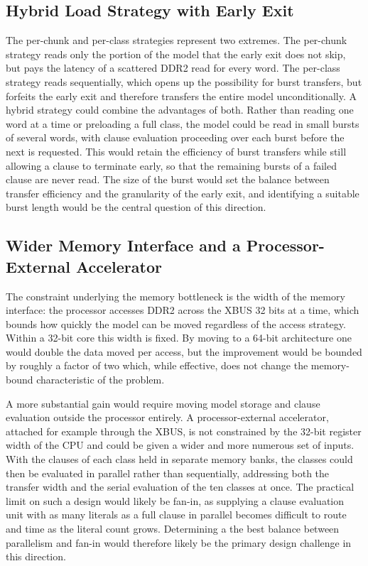 \subsection{Hybrid Load Strategy with Early Exit}
\label{sec:disc_hybrid}

The per-chunk and per-class strategies represent two extremes. The per-chunk strategy reads only the portion of the model that the early exit does not skip, but pays the latency of a scattered DDR2 read for every word. The per-class strategy reads sequentially, which opens up the possibility for burst transfers, but forfeits the early exit and therefore transfers the entire model unconditionally. A hybrid strategy could combine the advantages of both. Rather than reading one word at a time or preloading a full class, the model could be read in small bursts of several words, with clause evaluation proceeding over each burst before the next is requested. This would retain the efficiency of burst transfers while still allowing a clause to terminate early, so that the remaining bursts of a failed clause are never read. The size of the burst would set the balance between transfer efficiency and the granularity of the early exit, and identifying a suitable burst length would be the central question of this direction.

\subsection{Wider Memory Interface and a Processor-External Accelerator}
\label{sec:disc_external}

The constraint underlying the memory bottleneck is the width of the memory interface: the processor accesses DDR2 across the XBUS 32 bits at a time, which bounds how quickly the model can be moved regardless of the access strategy. Within a 32-bit core this width is fixed. By moving to a 64-bit architecture one would double the data moved per access, but the improvement would be bounded by roughly a factor of two which, while effective, does not change the memory-bound characteristic of the problem.

A more substantial gain would require moving model storage and clause evaluation outside the processor entirely. A processor-external accelerator, attached for example through the XBUS, is not constrained by the 32-bit register width of the CPU and could be given a wider and more numerous set of inputs. With the clauses of each class held in separate memory banks, the classes could then be evaluated in parallel rather than sequentially, addressing both the transfer width and the serial evaluation of the ten classes at once. The practical limit on such a design would likely be fan-in, as supplying a clause evaluation unit with as many literals as a full clause in parallel becomes difficult to route and time as the literal count grows. Determining a the best balance between parallelism and fan-in would therefore likely be the primary design challenge in this direction.

